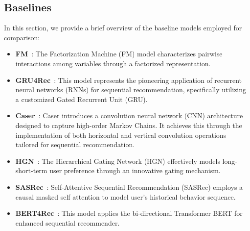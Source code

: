 \subsection{Baselines}\label{appendix:baseline}
In this section, we provide a brief overview of the baseline models employed for comparison:
\begin{itemize}[leftmargin=*]
\item \textbf{FM}~\citep{fm}: The Factorization Machine (FM) model characterizes pairwise interactions among variables through a factorized representation.
    \item \textbf{GRU4Rec}~\citep{gru4rec}: This model represents the pioneering application of recurrent neural networks (RNNs) for sequential recommendation, specifically utilizing a customized Gated Recurrent Unit (GRU).
    \item \textbf{Caser}~\citep{caser}: Caser introduces a convolution neural network (CNN) architecture designed to capture high-order Markov Chains. It achieves this through the implementation of both horizontal and vertical convolution operations tailored for sequential recommendation.
\item \textbf{HGN}~\citep{hgn}: The Hierarchical Gating Network (HGN) effectively models long-short-term user preference through an innovative gating mechanism.
\item \textbf{SASRec}~\citep{sasrec}: Self-Attentive Sequential Recommendation (SASRec) employs a causal masked self attention to model user’s historical behavior sequence.
\item \textbf{BERT4Rec}~\citep{bert4rec}: This model applies the bi-directional Transformer BERT for enhanced sequential recommender.
\end{itemize}

